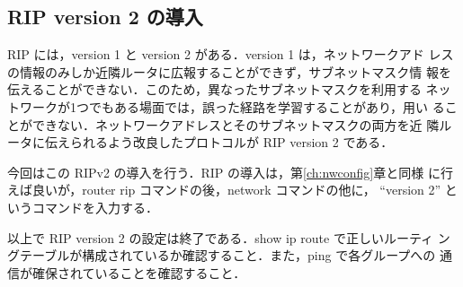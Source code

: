 \subsection*{RIP version 2 の導入}

RIP には，version 1 と version 2 がある．version 1 は，ネットワークアド
レスの情報のみしか近隣ルータに広報することができず，サブネットマスク情
報を伝えることができない．このため，異なったサブネットマスクを利用する
ネットワークが1つでもある場面では，誤った経路を学習することがあり，用い
ることができない．ネットワークアドレスとそのサブネットマスクの両方を近
隣ルータに伝えられるよう改良したプロトコルが RIP version 2 である．

今回はこの RIPv2 の導入を行う．RIP の導入は，第\ref{ch:nwconfig}章と同様
に行えば良いが，router rip コマンドの後，network コマンドの他に，
``version 2'' というコマンドを入力する．

以上で RIP version 2 の設定は終了である．show ip route で正しいルーティ
ングテーブルが構成されているか確認すること．また，ping で各グループへの
通信が確保されていることを確認すること．
